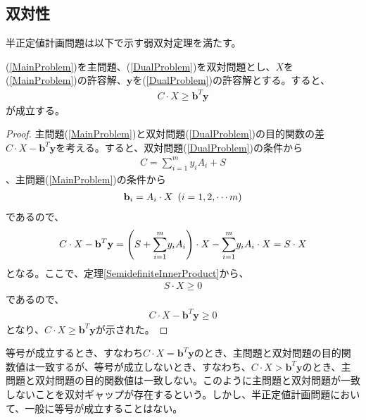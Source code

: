 \subsection{双対性}
半正定値計画問題は以下で示す弱双対定理を満たす。
\begin{theorem*}
  (\ref{MainProblem})を主問題、(\ref{DualProblem})を双対問題とし、$X$を(\ref{MainProblem})の許容解、$\mathbf{y}$を(\ref{DualProblem})の許容解とする。すると、
  \begin{align*}
    C \cdot X \geq \mathbf{b}^T \mathbf{y}
  \end{align*}
  が成立する。
\end{theorem*}
\begin{proof}
  主問題(\ref{MainProblem})と双対問題(\ref{DualProblem})の目的関数の差$C \cdot X - \mathbf{b}^T \mathbf{y}$を考える。すると、双対問題(\ref{DualProblem})の条件から
  \begin{align*}
    C = \displaystyle{\sum_{i = 1}^m} y_i A_i + S
  \end{align*}
  、主問題(\ref{MainProblem})の条件から
  \begin{align*}
    \mathbf{b}_i = A_i \cdot X \,\, \parenthesis(i = 1, 2, \cdots m)
  \end{align*}
  であるので、
  \begin{align*}
    C \cdot X - \mathbf{b}^T \mathbf{y} = \parenthesis(S + \displaystyle{\sum_{i = 1}^m} y_i A_i) \cdot X - \displaystyle{\sum_{i = 1}^m} y_i A_i \cdot X = S \cdot X
  \end{align*}
  となる。ここで、定理\ref{SemidefiniteInnerProduct}から、
  \begin{align*}
    S \cdot X \geq 0
  \end{align*}
  であるので、
  \begin{align*}
    C \cdot X - \mathbf{b}^T \mathbf{y} \geq 0
  \end{align*}
  となり、$C \cdot X \geq \mathbf{b}^T \mathbf{y}$が示された。
\end{proof}
等号が成立するとき、すなわち$C \cdot X = \mathbf{b}^T \mathbf{y}$のとき、主問題と双対問題の目的関数値は一致するが、等号が成立しないとき、すなわち、$C \cdot X > \mathbf{b}^T \mathbf{y}$のとき、主問題と双対問題の目的関数値は一致しない。このように主問題と双対問題が一致しないことを双対ギャップが存在するという。しかし、半正定値計画問題において、一般に等号が成立することはない\cite{SemidefiniteDuality}。
